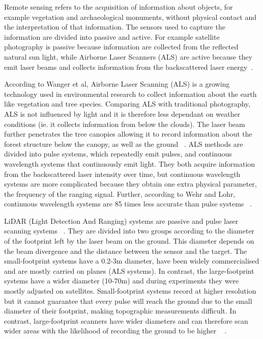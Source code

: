 \documentclass{subfiles}
\begin{document}
	\par Remote sensing refers to the acquisition of information about objects, {\color{blue} for example} vegetation and archaeological monuments, without physical contact and the interpretation of that information.  The sensors used to capture the information are divided into passive and active. For example satellite photography is passive because information are collected from the {\color{blue} reflected natural} sun light, while Airborne Laser Scanners (ALS) are active because they emit laser beams and collects information from the backscattered laser energy~\cite{Smith2012}.
	
	\par According to Wanger et al, Airborne Laser Scanning (ALS) is a growing technology used in environmental research to collect information about the earth like vegetation and tree species. Comparing ALS with traditional photography, {\color{blue} ALS is not influenced by light and it is therefore less dependant on weather conditions (ie. it collects information from below the clouds)}. The laser beam further penetrates the tree canopies {\color{blue} allowing it to record} information about the forest structure below the canopy, as well as the ground ~\cite{Wanger2004}. {\color{blue}ALS methods are divided into pulse systems, which repeatedly emit pulses, and continuous wavelength systems that continuously emit light. They both acquire information from the backscattered laser intensity over time, but continuous wavelength systems are more complicated because they obtain one extra physical parameter, the frequency of the ranging signal}. Further, according to Wehr and Lohr, continuous wavelength systems are 85 times less accurate than pulse systems ~\cite{Wehr1999}.
	
	\par {\color{blue} LiDAR (Light Detection And Ranging) systems are passive and pulse laser scanning systems ~\cite{Wehr1999}. They are divided into two groups according to the diameter of the footprint left by the laser beam on the ground. This diameter depends on the beam divergence and the distance between the sensor and the target. The small-footprint systems have a 0.2-3m diameter, have been widely commercialised and are mostly carried on planes (ALS systems). In contrast, the large-footprint systems have a wider diameter (10-70m) and during experiments they were mostly adjusted on satellites. Small-footprint systems record at higher resolution but it cannot guarantee that every pulse will reach the ground due to the small diameter of their footprint, making topographic measurements difficult. In contrast, large-footprint scanners have wider diameters and can therefore scan wider areas with the likelihood of recording the ground to be higher ~\cite{Mallet2009} }. 
	
\end{document}
